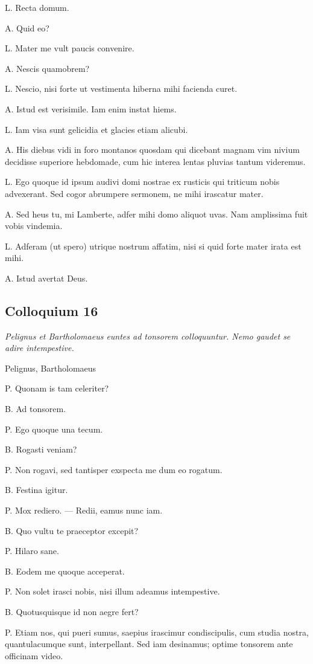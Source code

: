 \documentclass{article}
\begin{document}
L. Recta domum. 

A. Quid eo?

L. Mater me vult paucis convenire. 

A. Nescis quamobrem?

L. Nescio, nisi forte ut vestimenta hiberna mihi facienda curet. 

A. Istud est verisimile. Iam enim instat hiems. 

L. Iam visa sunt gelicidia et glacies etiam alicubi. 

A. His diebus vidi in foro montanos quosdam qui dicebant magnam vim nivium decidisse superiore hebdomade, cum hic interea lentas pluvias tantum videremus. 

L. Ego quoque id ipsum audivi domi nostrae ex rusticis qui triticum nobis advexerant. Sed cogor abrumpere sermonem, ne mihi irascatur mater. 

A. Sed heus tu, mi Lamberte, adfer mihi domo aliquot uvas. Nam amplissima fuit vobis vindemia. 

L. Adferam (ut spero) utrique nostrum affatim, nisi si quid forte mater irata est mihi. 

A. Istud avertat Deus.

\subsection{Colloquium 16}
\emph{Pelignus et Bartholomaeus euntes ad tonsorem colloquuntur. Nemo gaudet se adire intempestive.}

Pelignus, Bartholomaeus

P. Quonam is tam celeriter?

B. Ad tonsorem. 

P. Ego quoque una tecum. 

B. Rogasti veniam?

P. Non rogavi, sed tantisper exspecta me dum eo rogatum. 

B. Festina igitur.

P. Mox rediero. --- Redii, eamus nunc iam. 

B. Quo vultu te praeceptor excepit?

P. Hilaro sane. 

B. Eodem me quoque acceperat. 

P. Non solet irasci nobis, nisi illum adeamus intempestive. 

B. Quotusquisque id non aegre fert?

P. Etiam nos, qui pueri sumus, saepius irascimur condiscipulis, cum studia nostra, quantulacumque sunt, interpellant. Sed iam desinamus; optime tonsorem ante officinam video. 
\end{document}
